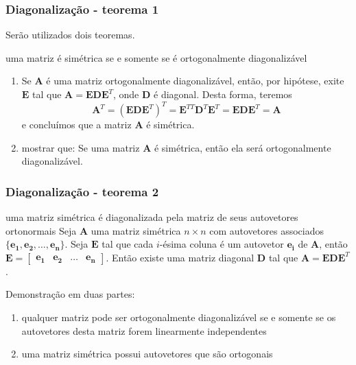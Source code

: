 \begin{frame}[allowframebreaks]
  \frametitle{Diagonalização - teorema 1}
  Serão utilizados dois teoremas.

  \begin{block}{uma matriz é simétrica se e somente se é ortogonalmente diagonalizável}
  \begin{enumerate}
  \item Se $\mathbf{A}$ é uma matriz ortogonalmente diagonalizável, então, por hipótese, exite $\mathbf{E}$ tal que $\mathbf{A} = \mathbf{E} \mathbf{D} \mathbf{E}^T$, onde $\mathbf{D}$ é diagonal. Desta forma, teremos
  \begin{equation}
  \mathbf{A}^T = (\mathbf{E} \mathbf{D} \mathbf{E}^T)^T = \mathbf{E}^{TT} \mathbf{D}^T \mathbf{E}^T = \mathbf{E} \mathbf{D} \mathbf{E}^T = \mathbf{A}
  \end{equation}
  e concluímos que a matriz $\mathbf{A}$ é simétrica.
  \item mostrar que: Se uma matriz $\mathbf{A}$ é simétrica, então ela será ortogonalmente diagonalizável.
  \end{enumerate}
  \end{block}
\end{frame}

\begin{frame}[allowframebreaks]
  \frametitle{Diagonalização - teorema 2}
  \begin{block}{uma matriz simétrica é diagonalizada pela matriz de seus autovetores ortonormais}
  Seja $\mathbf{A}$ uma matriz simétrica $n \times n$ com autovetores associados $\{ \mathbf{e_1}, \mathbf{e_2}, \ldots, \mathbf{e_n} \}$.
  Seja $\mathbf{E}$ tal que cada $i$-ésima coluna é um autovetor $\mathbf{e_i}$ de $\mathbf{A}$, então $\mathbf{E} = \begin{bmatrix} \mathbf{e_1} & \mathbf{e_2} & \ldots & \mathbf{e_n} \end{bmatrix}$.
  Então existe uma matriz diagonal $\mathbf{D}$ tal que $\mathbf{A} = \mathbf{E}\mathbf{D}\mathbf{E}^T$.

  Demonstração em duas partes:
  \begin{enumerate}
  \item qualquer matriz pode ser ortogonalmente diagonalizável se e somente se os autovetores desta matriz forem linearmente independentes
  \item uma matriz simétrica possui autovetores que são ortogonais
  \end{enumerate}
  \end{block}
\end{frame}

